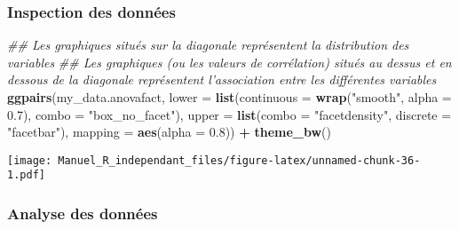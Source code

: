 \documentclass[
]{book}
\newenvironment{Shaded}{\begin{snugshade}}{\end{snugshade}}
\newcommand{\CommentTok}[1]{\textcolor[rgb]{0.56,0.35,0.01}{\textit{#1}}}
\newcommand{\DataTypeTok}[1]{\textcolor[rgb]{0.13,0.29,0.53}{#1}}
\newcommand{\FloatTok}[1]{\textcolor[rgb]{0.00,0.00,0.81}{#1}}
\newcommand{\KeywordTok}[1]{\textcolor[rgb]{0.13,0.29,0.53}{\textbf{#1}}}
\newcommand{\NormalTok}[1]{#1}
\newcommand{\OperatorTok}[1]{\textcolor[rgb]{0.81,0.36,0.00}{\textbf{#1}}}
\newcommand{\StringTok}[1]{\textcolor[rgb]{0.31,0.60,0.02}{#1}}
\begin{document}
\begin{Shaded}
\end{Shaded}

\hypertarget{inspection-des-donnuxe9es-2}{%
\subsubsection{Inspection des données}\label{inspection-des-donnuxe9es-2}}

\begin{Shaded}
\begin{Highlighting}[]
\CommentTok{## Les graphiques situés sur la diagonale représentent la distribution des variables}
\CommentTok{## Les graphiques (ou les valeurs de corrélation) situés au dessus et en dessous de la diagonale représentent l'association entre les différentes variables}
\KeywordTok{ggpairs}\NormalTok{(my_data.anovafact,}
        \DataTypeTok{lower =} \KeywordTok{list}\NormalTok{(}\DataTypeTok{continuous =} \KeywordTok{wrap}\NormalTok{(}\StringTok{"smooth"}\NormalTok{, }\DataTypeTok{alpha =} \FloatTok{0.7}\NormalTok{), }\DataTypeTok{combo =} \StringTok{"box_no_facet"}\NormalTok{),}
        \DataTypeTok{upper =} \KeywordTok{list}\NormalTok{(}\DataTypeTok{combo =} \StringTok{"facetdensity"}\NormalTok{, }\DataTypeTok{discrete =} \StringTok{"facetbar"}\NormalTok{), }
        \DataTypeTok{mapping =} \KeywordTok{aes}\NormalTok{(}\DataTypeTok{alpha =} \FloatTok{0.8}\NormalTok{)) }\OperatorTok{+}\StringTok{ }\KeywordTok{theme_bw}\NormalTok{()}
\end{Highlighting}
\end{Shaded}

\texttt{[image: Manuel\_R\_independant\_files/figure-latex/unnamed-chunk-36-1.pdf]}

\hypertarget{analyse-des-donnuxe9es-3}{%
\subsubsection{Analyse des données}\label{analyse-des-donnuxe9es-3}}
\end{document}
